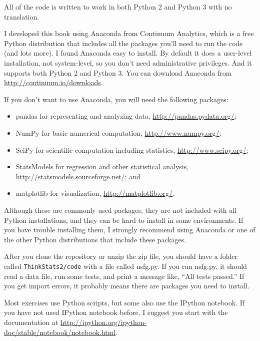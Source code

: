 \documentclass[12pt]{book}
\begin{document}
All of the code is written to work in both Python 2 and Python 3
with no translation.

I developed this book using Anaconda from
Continuum Analytics, which is a free Python distribution that includes
all the packages you'll need to run the code (and lots more).
I found Anaconda easy to install.  By default it does a user-level
installation, not system-level, so you don't need administrative
privileges.  And it supports both Python 2 and Python 3.  You can
download Anaconda from \url{http://continuum.io/downloads}.

If you don't want to use Anaconda, you will need the following
packages:

\begin{itemize}

\item pandas for representing and analyzing data,
  \url{http://pandas.pydata.org/};

\item NumPy for basic numerical computation, \url{http://www.numpy.org/};

\item SciPy for scientific computation including statistics,
  \url{http://www.scipy.org/};

\item StatsModels for regression and other statistical analysis,
\url{http://statsmodels.sourceforge.net/}; and

\item matplotlib for visualization, \url{http://matplotlib.org/}.

\end{itemize}

Although these are commonly used packages, they are not included with
all Python installations, and they can be hard to install in some
environments.  If you have trouble installing them, I strongly
recommend using Anaconda or one of the other Python distributions
that include these packages.

After you clone the repository or unzip the zip file, you should have
a folder called \verb"ThinkStats2/code" with a file called {nsfg.py}.
If you run {nsfg.py}, it should read a data file, run some tests, and print a
message like, ``All tests passed.''  If you get import errors, it
probably means there are packages you need to install.

Most exercises use Python scripts, but some also use the IPython
notebook.  If you have not used IPython notebook before, I suggest
you start with the documentation at
\url{http://ipython.org/ipython-doc/stable/notebook/notebook.html}.
\end{document}

